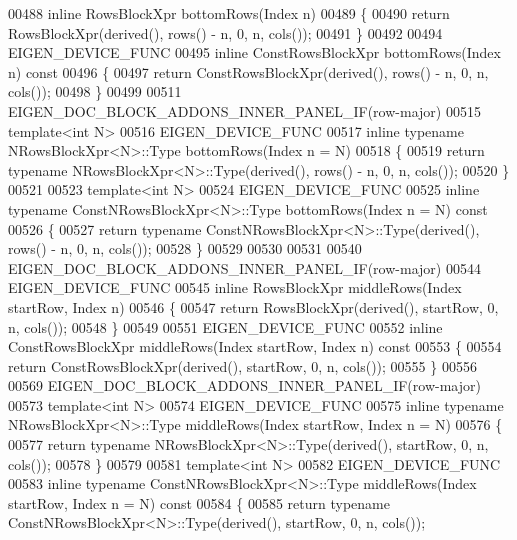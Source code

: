 \begin{DoxyCode}
00488 \textcolor{keyword}{inline} RowsBlockXpr bottomRows(Index n)
00489 \{
00490   \textcolor{keywordflow}{return} RowsBlockXpr(derived(), rows() - n, 0, n, cols());
00491 \}
00492 
00494 EIGEN\_DEVICE\_FUNC
00495 \textcolor{keyword}{inline} ConstRowsBlockXpr bottomRows(Index n)\textcolor{keyword}{ const}
00496 \textcolor{keyword}{}\{
00497   \textcolor{keywordflow}{return} ConstRowsBlockXpr(derived(), rows() - n, 0, n, cols());
00498 \}
00499 
00511 EIGEN\_DOC\_BLOCK\_ADDONS\_INNER\_PANEL\_IF(row-major)
00515 \textcolor{keyword}{template}<\textcolor{keywordtype}{int} N>
00516 EIGEN\_DEVICE\_FUNC
00517 \textcolor{keyword}{inline} \textcolor{keyword}{typename} NRowsBlockXpr<N>::Type bottomRows(Index n = N)
00518 \{
00519   \textcolor{keywordflow}{return} \textcolor{keyword}{typename} NRowsBlockXpr<N>::Type(derived(), rows() - n, 0, n, cols());
00520 \}
00521 
00523 \textcolor{keyword}{template}<\textcolor{keywordtype}{int} N>
00524 EIGEN\_DEVICE\_FUNC
00525 \textcolor{keyword}{inline} \textcolor{keyword}{typename} ConstNRowsBlockXpr<N>::Type bottomRows(Index n = N)\textcolor{keyword}{ const}
00526 \textcolor{keyword}{}\{
00527   \textcolor{keywordflow}{return} \textcolor{keyword}{typename} ConstNRowsBlockXpr<N>::Type(derived(), rows() - n, 0, n, cols());
00528 \}
00529 
00530 
00531 
00540 EIGEN\_DOC\_BLOCK\_ADDONS\_INNER\_PANEL\_IF(row-major)
00544 EIGEN\_DEVICE\_FUNC
00545 \textcolor{keyword}{inline} RowsBlockXpr middleRows(Index startRow, Index n)
00546 \{
00547   \textcolor{keywordflow}{return} RowsBlockXpr(derived(), startRow, 0, n, cols());
00548 \}
00549 
00551 EIGEN\_DEVICE\_FUNC
00552 \textcolor{keyword}{inline} ConstRowsBlockXpr middleRows(Index startRow, Index n)\textcolor{keyword}{ const}
00553 \textcolor{keyword}{}\{
00554   \textcolor{keywordflow}{return} ConstRowsBlockXpr(derived(), startRow, 0, n, cols());
00555 \}
00556 
00569 EIGEN\_DOC\_BLOCK\_ADDONS\_INNER\_PANEL\_IF(row-major)
00573 \textcolor{keyword}{template}<\textcolor{keywordtype}{int} N>
00574 EIGEN\_DEVICE\_FUNC
00575 \textcolor{keyword}{inline} \textcolor{keyword}{typename} NRowsBlockXpr<N>::Type middleRows(Index startRow, Index n = N)
00576 \{
00577   \textcolor{keywordflow}{return} \textcolor{keyword}{typename} NRowsBlockXpr<N>::Type(derived(), startRow, 0, n, cols());
00578 \}
00579 
00581 \textcolor{keyword}{template}<\textcolor{keywordtype}{int} N>
00582 EIGEN\_DEVICE\_FUNC
00583 \textcolor{keyword}{inline} \textcolor{keyword}{typename} ConstNRowsBlockXpr<N>::Type middleRows(Index startRow, Index n = N)\textcolor{keyword}{ const}
00584 \textcolor{keyword}{}\{
00585   \textcolor{keywordflow}{return} \textcolor{keyword}{typename} ConstNRowsBlockXpr<N>::Type(derived(), startRow, 0, n, cols());

\end{DoxyCode}

